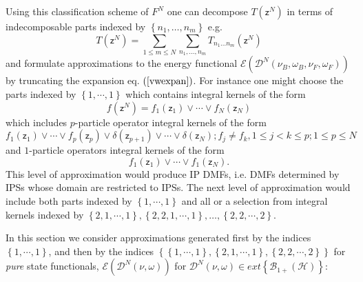 \documentclass[aps,preprint]{revtex4}%
\begin{document}
Using this classification scheme of $F^{N}$ one can decompose $T\left(
\mathsf{z}^{N}\right)  $ in terms of indecomposable parts indexed by $\left\{
n_{1},\ldots,n_{m}\right\}  $ e.g.
\begin{equation}
T\left(  \mathsf{z}^{N}\right)  =\sum_{1\leq m\leq N}%
{\textstyle\sum\limits_{n_{1},\ldots,n_{m}}}
T_{n_{1}\ldots n_{m}}\left(  \mathsf{z}^{N}\right)  \label{vwexpan}%
\end{equation}
and formulate approximations to the energy functional $\mathcal{E}\left(
\mathcal{D}^{N}\left(  \nu_{B},\omega_{B},\nu_{F},\omega_{F}\right)  \right)
$ by truncating the expansion eq. $\left(  \ref{vwexpan}\right)  $. For
instance one might choose the parts indexed by $\left\{  1,\cdots,1\right\}  $
which contains integral kernels of the form
\begin{equation}
f\left(  \mathsf{z}^{N}\right)  =f_{1}\left(  \mathsf{z}_{1}\right)
\vee\cdots\vee f_{N}\left(  \mathsf{z}_{N}\right)
\end{equation}
which includes $p$-particle operator integral kernels of the form%
\begin{equation}
f_{1}\left(  \mathsf{z}_{1}\right)  \vee\cdots\vee f_{p}\left(  \mathsf{z}%
_{p}\right)  \vee\delta\left(  \mathsf{z}_{p+1}\right)  \vee\cdots\vee
\delta\left(  \mathsf{z}_{N}\right)  ;f_{j}\neq f_{k},1\leq j<k\leq p;1\leq
p\leq N
\end{equation}
and $1$-particle operators integral kernels of the form
\begin{equation}
f_{1}\left(  \mathsf{z}_{1}\right)  \vee\cdots\vee f_{1}\left(  \mathsf{z}%
_{N}\right)  .
\end{equation}
This level of approximation would produce IP DMFs, i.e. DMFs determined by
IPSs whose domain are restricted to IPSs. The next level of approximation
would include both parts indexed by $\left\{  1,\cdots,1\right\}  $ and all or
a selection from integral kernels indexed by $\left\{  2,1,\cdots,1\right\}
,\left\{  2,2,1,\cdots,1\right\}  ,\ldots,\left\{  2,2,\cdots,2\right\}  $.

In this section we consider approximations generated first by the indices
$\left\{  1,\cdots,1\right\}  $, and then by the indices $\left\{  \left\{
1,\cdots,1\right\}  ,\left\{  2,1,\cdots,1\right\}  ,\left\{  2,2,\cdots
,2\right\}  \right\}  $ for \emph{pure }state functionals, $\mathcal{E}\left(
\mathcal{D}^{N}\left(  \nu,\omega\right)  \right)  $ for $\mathcal{D}%
^{N}\left(  \nu,\omega\right)  \in ext\left\{  \mathcal{B}_{1+}\left(
\mathcal{H}\right)  \right\}  $:
\end{document}

